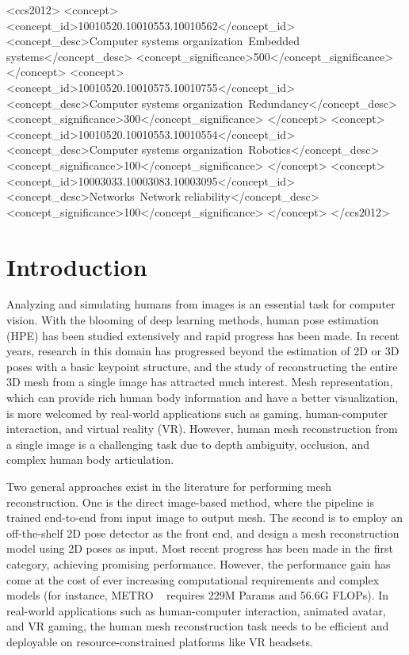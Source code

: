 \documentclass[sigconf]{acmart}
\begin{document}
\begin{CCSXML}
<ccs2012>
 <concept>
  <concept_id>10010520.10010553.10010562</concept_id>
  <concept_desc>Computer systems organization~Embedded systems</concept_desc>
  <concept_significance>500</concept_significance>
 </concept>
 <concept>
  <concept_id>10010520.10010575.10010755</concept_id>
  <concept_desc>Computer systems organization~Redundancy</concept_desc>
  <concept_significance>300</concept_significance>
 </concept>
 <concept>
  <concept_id>10010520.10010553.10010554</concept_id>
  <concept_desc>Computer systems organization~Robotics</concept_desc>
  <concept_significance>100</concept_significance>
 </concept>
 <concept>
  <concept_id>10003033.10003083.10003095</concept_id>
  <concept_desc>Networks~Network reliability</concept_desc>
  <concept_significance>100</concept_significance>
 </concept>
</ccs2012>
\end{CCSXML}









\maketitle


\section{Introduction}

Analyzing and simulating humans from images is an essential task for computer vision. With the blooming of deep learning methods, human pose estimation (HPE) has been studied extensively and rapid progress has been made. 
In recent years, research in this domain has progressed beyond the estimation of 2D or 3D poses \cite{hrnet}\cite{pavllo20193d}\cite{liu2020attention} with a basic keypoint structure, and the study of reconstructing the entire 3D mesh from a single image has attracted much interest. Mesh representation, which can provide rich human body information and have a better visualization, is more welcomed by real-world applications such as gaming, human-computer interaction, and virtual reality (VR). However, human mesh reconstruction from a single image is a challenging task due to depth ambiguity, occlusion, and complex human body articulation.

Two general approaches exist in the literature for performing mesh reconstruction. One is the direct image-based method, where the pipeline is trained end-to-end from input image to output mesh. The second is to employ an off-the-shelf 2D pose detector as the front end, and design a mesh reconstruction model using 2D poses as input. Most recent progress has been made in the first category, achieving promising performance. However, the performance gain has come at the cost of ever increasing computational requirements and complex models  (for instance, METRO ~\cite{lin2021metro} requires 229M Params and 56.6G FLOPs).
In real-world applications such as human-computer interaction, animated avatar, and VR gaming, the human mesh reconstruction task needs to be efficient and deployable on resource-constrained platforms like VR headsets.
\end{document}
